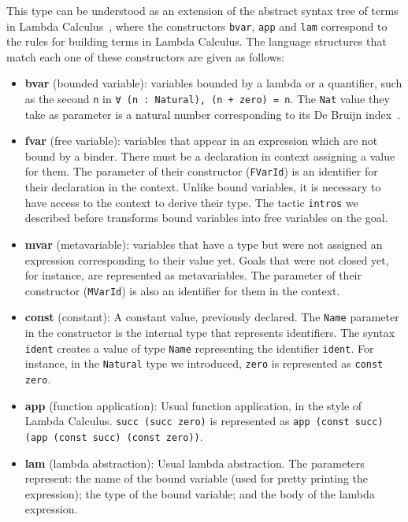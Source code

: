 This type can be understood as an extension of the abstract syntax tree of terms in Lambda Calculus~\cite{lcIntro}, where the constructors \texttt{bvar}, \texttt{app} and \texttt{lam} correspond to the rules for building terms in Lambda Calculus. The language structures that match each one of these constructors are given as follows:
\begin{itemize}
  \item \textbf{bvar} (bounded variable): variables bounded by a lambda or a quantifier, such as the second \texttt{n} in \texttt{∀ (n : Natural), (n + zero) = n}. The \texttt{Nat} value they take as parameter is a natural number corresponding to its De Bruijn index~\cite{debruijnIndices}.
  \item \textbf{fvar} (free variable): variables that appear in an expression which are not bound by a binder. There must be a declaration in context assigning a value for them.  The parameter of their constructor (\texttt{FVarId}) is an identifier for their declaration in the context. Unlike bound variables, it is necessary to have access to the context to derive their type. The tactic \texttt{intros} we described before transforms bound variables into free variables on the goal.
  \item \textbf{mvar} (metavariable): variables that have a type but were not assigned an expression corresponding to their value yet. Goals that were not closed yet, for instance, are represented as metavariables. The parameter of their constructor (\texttt{MVarId}) is also an identifier for them in the context.
  \item \textbf{const} (constant): A constant value, previously declared. The \texttt{Name} parameter in the constructor is the internal type that represents identifiers. The syntax \texttt{\textasciigrave ident} creates a value of type \texttt{Name} representing the identifier \texttt{ident}. For instance, in the \texttt{Natural} type we introduced, \texttt{zero} is represented as \texttt{const \textasciigrave zero}.
  \item \textbf{app} (function application): Usual function application, in the style of Lambda Calculus. \texttt{succ (succ zero)} is represented as \texttt{app (const \textasciigrave succ) (app (const \textasciigrave succ) (const \textasciigrave zero))}.
  \item \textbf{lam} (lambda abstraction): Usual lambda abstraction. The parameters represent: the name of the bound variable (used for pretty printing the expression); the type of the bound variable; and the body of the lambda expression.

\end{itemize}
